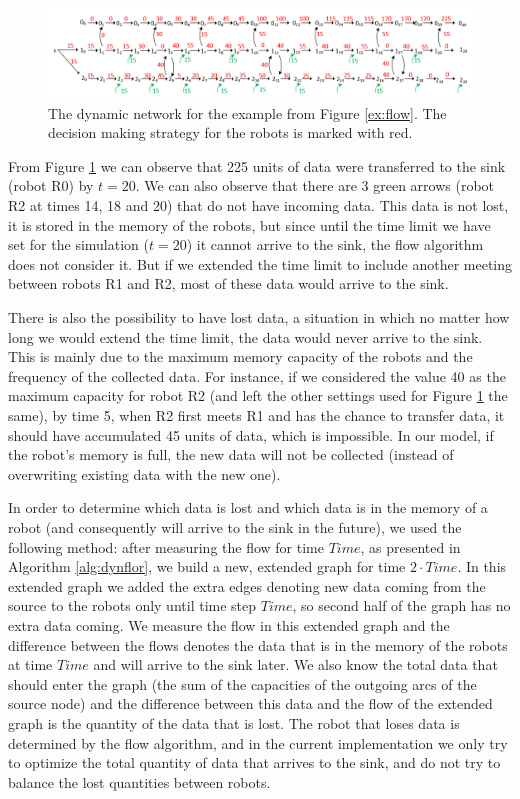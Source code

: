 \begin{figure}[!htb]
\centering
\includegraphics[scale=0.33]{Figures/FlowFinal2.png}

\caption{The dynamic network for the example from Figure \ref{ex:flow}. The decision making strategy for the robots is marked with red.}
\label{patrolling}
\end{figure}

From Figure \ref{patrolling} we can observe that 225 units of data were transferred to the sink (robot R0) by $t = 20$. We can also observe that there are 3 green arrows (robot R2 at times 14, 18 and 20) that do not have incoming data. This data is not lost, it is stored in the memory of the robots, but since until the time limit we have set for the simulation ($t=20$) it cannot arrive to the sink, the flow algorithm does not consider it. But if we extended the time limit to include another meeting between robots R1 and R2, most of these data would arrive to the sink.

There is also the possibility to have lost data, a situation in which no matter how long we would extend the time limit, the data would never arrive to the sink. This is mainly due to the maximum memory capacity of the robots and the frequency of the collected data.    For instance, if we considered the value 40 as the maximum capacity for robot R2 (and left the other settings used for Figure \ref{patrolling} the same), by time 5, when R2 first meets R1 and has the chance to transfer data, it should have accumulated 45 units of data, which is impossible. In our model, if the robot's memory is full, the new data will not be collected (instead of overwriting existing data with the new one).

In order to determine which data is lost and which data is in the memory of a robot (and consequently will arrive to the sink in the future), we used the following method: after measuring the flow for time $Time$, as presented in Algorithm \ref{alg:dynflor}, we build a new, extended graph for time $2 \cdot Time$. In this extended graph we added the extra edges denoting new data coming from the source to the robots only until time step $Time$, so second half of the graph has no extra data coming. We measure the flow in this extended graph and the difference between the flows denotes the data that is in the memory of the robots at time $Time$ and will arrive to the sink later. We also know the total data that should enter the graph (the sum of the capacities of the outgoing arcs of the source node) and the difference between this data and the flow of the extended graph is the quantity of the data that is lost.
The robot that loses data is determined by the flow algorithm, and in the current implementation we only try to optimize the total quantity of data that arrives to the sink, and do not try to balance the lost quantities between robots.

